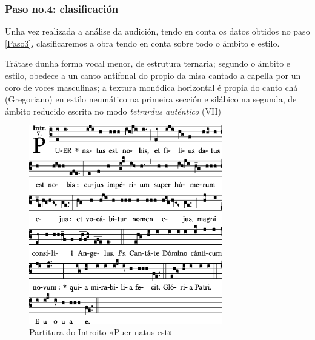 \subsubsection*{Paso no.4: clasificación} \label{Clasificación-puer-natus}
Unha vez realizada a análise da audición, tendo en conta os datos obtidos no paso  \ref{Paso3}, clasificaremos a obra tendo en conta sobre todo o ámbito e estilo.
%
\vspace*{0.25cm}
\begin{ejercicio}
\small{Trátase dunha forma vocal menor, de estrutura ternaria; segundo o ámbito e estilo, obedece a un canto antifonal do propio da misa cantado a capella por un coro de voces masculinas; a textura monódica horizontal é propia do canto chá (Gregoriano) en estilo neumático na primeira sección e silábico na segunda, de ámbito reducido escrita no modo \textit{tetrardus auténtico} (VII)     }
%
%
        \vspace*{2.78cm}
\end{ejercicio}
%
\begin{figure}[h]
    \centering
    \includegraphics[width=0.75\textwidth]{figures/audicions/Puer-natus.eps}
    \caption{Partitura do Introito «Puer natus est»}
    \label{fig:puer-natus}
\end{figure}
%
%
%
%
